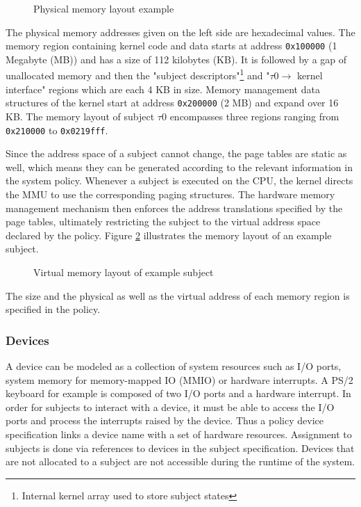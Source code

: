\begin{figure}[h]
	\centering
	
	\caption{Physical memory layout example}
	\label{fig:phys-mem-layout-example}
\end{figure}

The physical memory addresses given on the left side are hexadecimal values.
The memory region containing kernel code and data starts at address
\texttt{0x100000} (1 Megabyte (MB)) and has a size of 112 kilobytes (KB). It is
followed by a gap of unallocated memory and then the "subject
descriptors"\footnote{Internal kernel array used to store subject states} and
"$\tau0\rightarrow$ kernel interface" regions which are each 4 KB in size.
Memory management data structures of the kernel start at address
\texttt{0x200000} (2 MB) and expand over 16 KB. The memory layout of subject
$\tau0$ encompasses three regions ranging from \texttt{0x210000} to
\texttt{0x0219fff}.

Since the address space of a subject cannot change, the page tables are static
as well, which means they can be generated according to the relevant information
in the system policy. Whenever a subject is executed on the CPU, the kernel
directs the MMU to use the corresponding paging structures. The hardware memory
management mechanism then enforces the address translations specified by the
page tables, ultimately restricting the subject to the virtual address space
declared by the policy. Figure \ref{fig:virt-mem-layout-example} illustrates the
memory layout of an example subject.

\begin{figure}[h]
	\centering
	
	\caption{Virtual memory layout of example subject}
	\label{fig:virt-mem-layout-example}
\end{figure}

The size and the physical as well as the virtual address of each memory region
is specified in the policy.

\subsubsection{Devices}
A device can be modeled as a collection of system resources such as I/O ports,
system memory for memory-mapped IO (MMIO) or hardware interrupts. A PS/2
keyboard for example is composed of two I/O ports and a hardware interrupt.  In
order for subjects to interact with a device, it must be able to access the I/O
ports and process the interrupts raised by the device. Thus a policy device
specification links a device name with a set of hardware resources. Assignment
to subjects is done via references to devices in the subject specification.
Devices that are not allocated to a subject are not accessible during the
runtime of the system.

